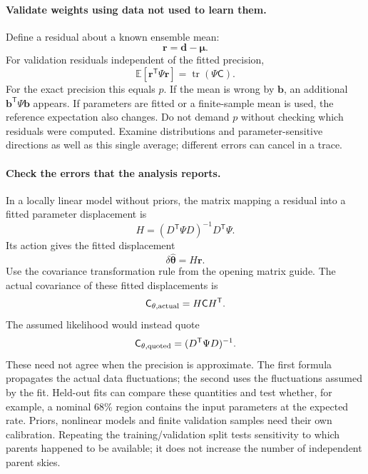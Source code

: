 \documentclass[11pt]{article}
\newcommand{\Cov}{\mathsf{C}}
\newcommand{\T}{^{\mathsf{T}}}
\newcommand{\E}{\mathbb{E}}
\begin{document}
\paragraph{Validate weights using data not used to learn them.}
Define a residual about a known ensemble mean:
\begin{equation}
 \boldsymbol r=\boldsymbol d-\boldsymbol\mu.
\end{equation}
For validation residuals independent of the fitted precision,
\begin{equation}
 \E[\boldsymbol r\T\Psi\boldsymbol r]=\operatorname{tr}(\Psi\Cov).
\end{equation}
For the exact precision this equals $p$. If the mean is wrong by
$\boldsymbol b$, an additional $\boldsymbol b\T\Psi\boldsymbol b$ appears.
If parameters are fitted or a finite-sample mean is used, the reference
expectation also changes. Do not demand $p$ without checking which residuals
were computed. Examine distributions and parameter-sensitive directions as
well as this single average; different errors can cancel in a trace.

\paragraph{Check the errors that the analysis reports.}
In a locally linear model without priors, the matrix mapping a residual
into a fitted parameter displacement is
\begin{equation}
 H=(D\T\Psi D)^{-1}D\T\Psi.
\end{equation}
Its action gives the fitted displacement
\begin{equation}
 \delta\widehat{\boldsymbol\theta}=H\boldsymbol r.
\end{equation}
Use the covariance transformation rule from the opening matrix guide.
The actual covariance of these fitted displacements is
\begin{equation}
 \Cov_{\theta,\rm actual}=H\Cov H\T.
\end{equation}
The assumed likelihood would instead quote
\begin{equation}
 \Cov_{\theta,\rm quoted}=(D\T\Psi D)^{-1}.
\end{equation}
These need not agree when the precision is approximate. The first formula
propagates the actual data fluctuations; the second uses the fluctuations
assumed by the fit.
Held-out fits can compare these quantities and test whether, for example,
a nominal 68\% region contains the input parameters at the expected rate.
Priors, nonlinear models and finite validation samples need their own
calibration. Repeating the training/validation split tests sensitivity to
which parents happened to be available; it does not increase the number
of independent parent skies.
\end{document}
